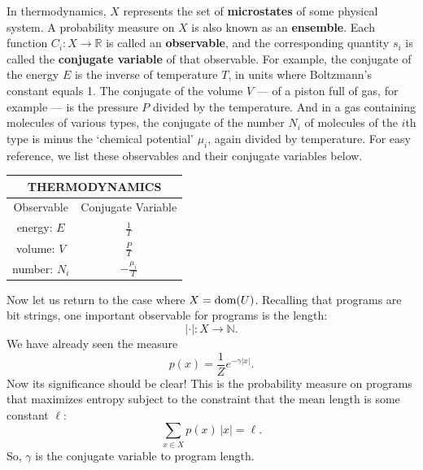 \documentclass{article}
\newcommand{\R}{{\mathbb R}}
\newcommand{\N}{{\mathbb N}}
\newcommand{\dom}{{\rm dom}}
\renewcommand{\to}{\rightarrow}
\newcommand{\maps}{\colon}
\begin{document}
In thermodynamics, $X$ represents the set of {\bf microstates} of some
physical system.  A probability measure on $X$ is also known as an
{\bf ensemble}.  Each function $C_i \maps X \to \R$ is called an {\bf
observable}, and the corresponding quantity $s_i$ is called the {\bf
conjugate variable} of that observable.  For example, the conjugate of
the energy $E$ is the inverse of temperature $T$, in units where
Boltzmann's constant equals 1.  The conjugate of the volume $V$ --- of
a piston full of gas, for example --- is the pressure $P$ divided by
the temperature.  And in a gas containing molecules of various types,
the conjugate of the number $N_i$ of molecules of the $i$th type is
minus the `chemical potential' $\mu_i$, again divided by temperature.
For easy reference, we list these observables and their conjugate
variables below.

\begin{center}
\renewcommand{\arraystretch}{2.3}
\begin{tabular}{c|c}	
\multicolumn{2}{c}{\bf{THERMODYNAMICS}} \\
\hline
Observable    &  Conjugate Variable\\ 
\hline
energy: $E$   &  $\displaystyle{\frac{1}{T}}$ \\
volume: $V$   &  $\displaystyle{\frac{P}{T}}$  \\
number: $N_i$ &  $\displaystyle{-\frac{\mu_i}{T}}$   \\
\end{tabular}
\end{center}
\renewcommand{\arraystretch}{1}

Now let us return to the case where $X=\dom(U)$.  Recalling that programs
are bit strings, one important observable for programs is the length:
\[  |\cdot | \maps X \to \N .\]
We have already seen the measure
\[   p(x) = \frac{1}{Z} e^{-\gamma |x|} .\]
Now its significance should be clear!   This is the 
probability measure on programs
that maximizes entropy subject to the constraint that the mean length
is some constant $\ell$:
\[    \sum_{x \in X}  p(x) \, |x| = \ell .  \]
So, $\gamma$ is the conjugate variable to program length.
\end{document}
